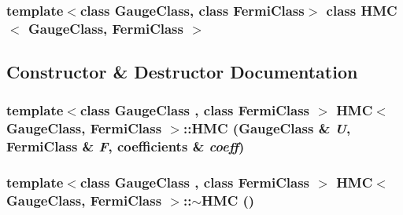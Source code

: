 \subsubsection*{template$<$class GaugeClass, class FermiClass$>$ class HMC$<$ GaugeClass, FermiClass $>$}



\subsection{Constructor \& Destructor Documentation}
\hypertarget{class_h_m_c_aafdc157997f16364f023298ed1de48cb}{
\subsubsection[{HMC}]{\setlength{\rightskip}{0pt plus 5cm}template$<$class GaugeClass , class FermiClass $>$ {\bf HMC}$<$ GaugeClass, FermiClass $>$::{\bf HMC} (GaugeClass \& {\em U}, \/  FermiClass \& {\em F}, \/  {\bf coefficients} \& {\em coeff})}}
\label{class_h_m_c_aafdc157997f16364f023298ed1de48cb}
\hypertarget{class_h_m_c_add3a4a1409a737ccea8c7dae3760d0b3}{
\subsubsection[{$\sim$HMC}]{\setlength{\rightskip}{0pt plus 5cm}template$<$class GaugeClass , class FermiClass $>$ {\bf HMC}$<$ GaugeClass, FermiClass $>$::$\sim${\bf HMC} ()}}
\label{class_h_m_c_add3a4a1409a737ccea8c7dae3760d0b3}


